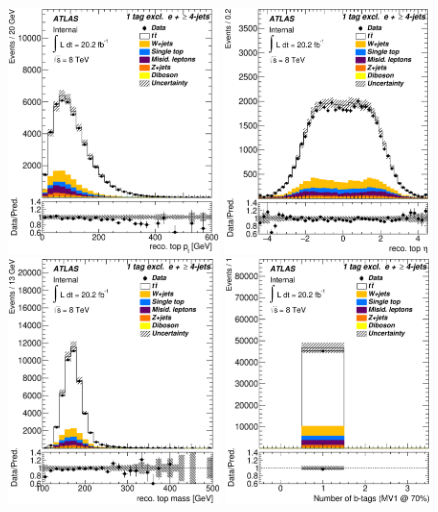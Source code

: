 \begin{figure}[!h]
\begin{center}
		\includegraphics[height=65mm]{chapters/whel/figures/control_Plots2/bTag_1excl/reco_Top_pt_el}
		\includegraphics[height=65mm]{chapters/whel/figures/control_Plots2/bTag_1excl/reco_Top_eta_el}\\
		\includegraphics[height=65mm]{chapters/whel/figures/control_Plots2/bTag_1excl/reco_Top_m_el}
		\includegraphics[height=65mm]{chapters/whel/figures/control_Plots2/bTag_1excl/NumberBtags_el}\\

\end{center}
\end{figure}
